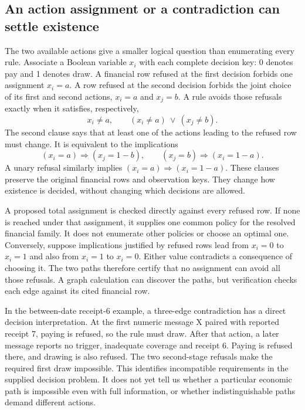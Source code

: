 \subsection{An action assignment or a contradiction can settle existence}

The two available actions give a smaller logical question than enumerating every rule. Associate a Boolean variable $x_i$ with each complete decision key: 0 denotes pay and 1 denotes draw. A financial row refused at the first decision forbids one assignment $x_i=a$. A row refused at the second decision forbids the joint choice of its first and second actions, $x_i=a$ and $x_j=b$. A rule avoids those refusals exactly when it satisfies, respectively,
\begin{equation}
 x_i\ne a,
 \qquad
 (x_i\ne a)\ \lor\ (x_j\ne b).
 \label{eq:policy-refusal-clauses}
\end{equation}
The second clause says that at least one of the actions leading to the refused row must change. It is equivalent to the implications
\begin{equation}
 (x_i=a)\Rightarrow(x_j=1-b),
 \qquad
 (x_j=b)\Rightarrow(x_i=1-a).
 \label{eq:policy-refusal-implications}
\end{equation}
A unary refusal similarly implies $(x_i=a)\Rightarrow(x_i=1-a)$. These clauses preserve the original financial rows and observation keys. They change how existence is decided, without changing which decisions are allowed.

A proposed total assignment is checked directly against every refused row. If none is reached under that assignment, it supplies one common policy for the resolved financial family. It does not enumerate other policies or choose an optimal one. Conversely, suppose implications justified by refused rows lead from $x_i=0$ to $x_i=1$ and also from $x_i=1$ to $x_i=0$. Either value contradicts a consequence of choosing it. The two paths therefore certify that no assignment can avoid all those refusals. A graph calculation can discover the paths, but verification checks each edge against its cited financial row.

In the between-date receipt-6 example, a three-edge contradiction has a direct decision interpretation. At the first numeric message X paired with reported receipt 7, paying is refused, so the rule must draw. After that action, a later message reports no trigger, inadequate coverage and receipt 6. Paying is refused there, and drawing is also refused. The two second-stage refusals make the required first draw impossible. This identifies incompatible requirements in the supplied decision problem. It does not yet tell us whether a particular economic path is impossible even with full information, or whether indistinguishable paths demand different actions.

